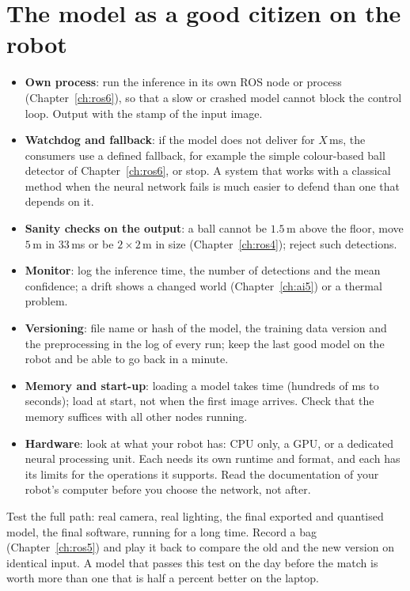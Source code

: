 \section*{The model as a good citizen on the robot}
\begin{itemize}[nosep]
\item \textbf{Own process}: run the inference in its own ROS node or process (Chapter~\ref{ch:ros6}), so that a slow or crashed model cannot block the control loop. Output with the stamp of the input image.
\item \textbf{Watchdog and fallback}: if the model does not deliver for $X$\,ms, the consumers use a defined fallback, for example the simple colour-based ball detector of Chapter~\ref{ch:ros6}, or stop. A system that works with a classical method when the neural network fails is much easier to defend than one that depends on it.
\item \textbf{Sanity checks on the output}: a ball cannot be $1.5$\,m above the floor, move $5$\,m in $33$\,ms or be $2\times2$\,m in size (Chapter~\ref{ch:ros4}); reject such detections.
\item \textbf{Monitor}: log the inference time, the number of detections and the mean confidence; a drift shows a changed world (Chapter~\ref{ch:ai5}) or a thermal problem.
\item \textbf{Versioning}: file name or hash of the model, the training data version and the preprocessing in the log of every run; keep the last good model on the robot and be able to go back in a minute.
\item \textbf{Memory and start-up}: loading a model takes time (hundreds of ms to seconds); load at start, not when the first image arrives. Check that the memory suffices with all other nodes running.
\item \textbf{Hardware}: look at what your robot has: CPU only, a GPU, or a dedicated neural processing unit. Each needs its own runtime and format, and each has its limits for the operations it supports. Read the documentation of your robot's computer before you choose the network, not after.
\end{itemize}

\begin{aibox}
Test the full path: real camera, real lighting, the final exported and quantised model, the final software, running for a long time. Record a bag (Chapter~\ref{ch:ros5}) and play it back to compare the old and the new version on identical input. A model that passes this test on the day before the match is worth more than one that is half a percent better on the laptop.
\end{aibox}

